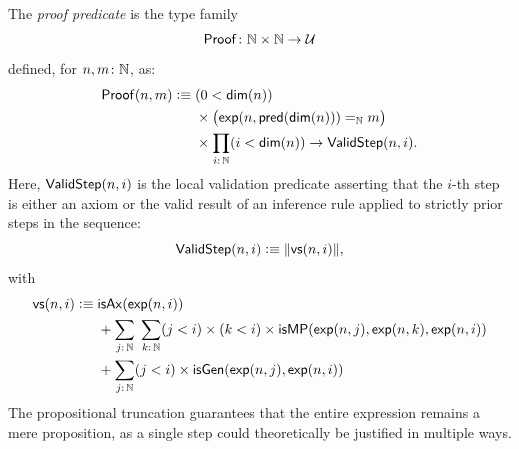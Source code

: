\begin{defn}\label{dfn:Proof}
    The \textsl{proof predicate} is the type family
    \[
        \fun{Proof}\colon\N\times\N\to\univ
    \]
    defined, for $n,m\colon\N$, as:
    \begin{align*}
        \fun{Proof}(n,m)\defeq\;&(0<\fun{dim}(n))\\
            &\times
                \bigl(
                    \fun{exp}(
                        n,
                        \fun{pred}(\fun{dim}(n))
                    )
                    \eq{\N}
                    m
                \bigr)\\
            &\times\prod_{i\colon\N}
                (i<\fun{dim}(n))\to\fun{ValidStep}(n,i).
    \end{align*}
    Here, $\mathsf{ValidStep}(n,i)$ is the local validation predicate asserting that the $i$-th step is either an axiom or the valid result of an inference rule applied to strictly prior steps in the sequence:
    \[
        \mathsf{ValidStep}(n,i)\mathrel{\vcentcolon}\equiv\lVert\mathsf{vs}(n,i)\rVert,
    \]
    with
    \begin{align*}
        \fun{vs}(n,i)\defeq\;
            &\fun{isAx}(\fun{exp}(n,i))\\
            &+\sum_{j\colon\N}\;\sum_{k\colon\N}
                (j<i)
                \times(k<i)
                \times\fun{isMP}(
                    \fun{exp}(n,j),
                    \fun{exp}(n,k),
                    \fun{exp}(n,i)
                )\\
            &+\sum_{j\colon\N}(j<i)
                \times\fun{isGen}(
                    \fun{exp}(n,j),
                    \fun{exp}(n,i)
                )
    \end{align*}
    The propositional truncation guarantees that the entire expression remains a mere proposition, as a single step could theoretically be justified in multiple ways.
\end{defn}


